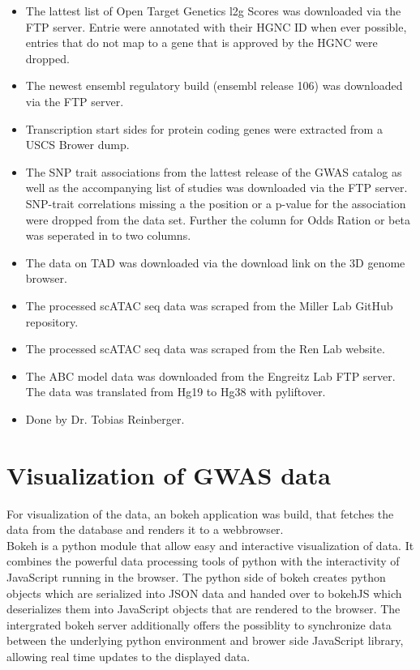 \begin{itemize}
    \item {} The lattest list of Open Target Genetics l2g Scores was downloaded via the FTP server. Entrie were annotated with their HGNC ID when ever possible, entries that do not map to a gene that is approved by the HGNC were dropped.
    \item {} The newest ensembl regulatory build (ensembl release 106) was downloaded via the FTP server.
    \item {} Transcription start sides for protein coding genes were extracted from a USCS Brower dump.
    \item {} The SNP trait associations from the lattest release of the GWAS catalog as well as the accompanying list of studies was downloaded via the FTP server. SNP-trait correlations missing a the position or a p-value for the association were dropped from the data set. Further the column for Odds Ration or beta was seperated in to two columns.
    \item {} The data on TAD was downloaded via the download link on the 3D genome browser.
    \item {} The processed scATAC seq data was scraped from the Miller Lab GitHub repository.
    \item {} The processed scATAC seq data was scraped from the Ren Lab website.
    \item {} The ABC model data was downloaded from the Engreitz Lab FTP server. The data was translated from Hg19 to Hg38 with pyliftover.
    \item {} Done by Dr. Tobias Reinberger.
\end{itemize}


\section{Visualization of GWAS data}
\label{sec:gwas_vis}
For visualization of the data, an bokeh application was build, that fetches the data from the database and renders it to a webbrowser.\\
Bokeh is a python module that allow easy and interactive visualization of data. It combines the powerful data processing tools of python with the interactivity of JavaScript running in the browser. The python side of bokeh creates python objects which are serialized into JSON data and handed over to bokehJS which deserializes them into JavaScript objects that are rendered to the browser. The intergrated bokeh server additionally offers the possiblity to synchronize data between the underlying python environment and brower side JavaScript library, allowing real time updates to the displayed data.

